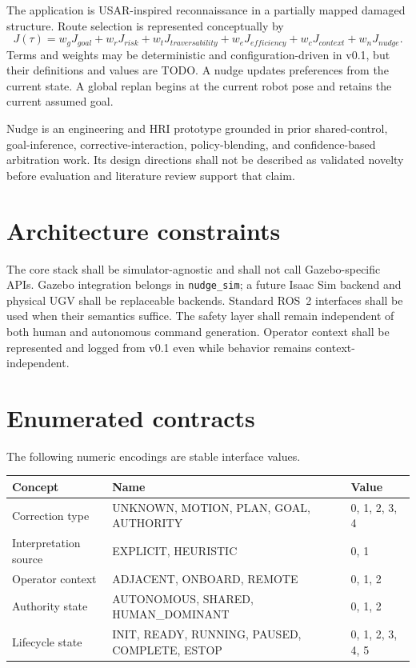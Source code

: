 \documentclass[11pt]{article}
\begin{document}
The application is USAR-inspired reconnaissance in a partially mapped damaged
structure. Route selection is represented conceptually by
\[
J(\tau)=w_gJ_{goal}+w_rJ_{risk}+w_tJ_{traversability}+w_eJ_{efficiency}
       +w_cJ_{context}+w_nJ_{nudge}.
\]
Terms and weights may be deterministic and configuration-driven in v0.1, but
their definitions and values are TODO. A nudge updates preferences from the
current state. A global replan begins at the current robot pose and retains the
current assumed goal.

Nudge is an engineering and HRI prototype grounded in prior shared-control,
goal-inference, corrective-interaction, policy-blending, and confidence-based
arbitration work. Its design directions shall not be described as validated
novelty before evaluation and literature review support that claim.

\section{Architecture constraints}
The core stack shall be simulator-agnostic and shall not call Gazebo-specific
APIs. Gazebo integration belongs in \texttt{nudge\_sim}; a future Isaac Sim
backend and physical UGV shall be replaceable backends. Standard ROS~2
interfaces shall be used when their semantics suffice. The safety layer shall
remain independent of both human and autonomous command generation. Operator
context shall be represented and logged from v0.1 even while behavior remains
context-independent.

\section{Enumerated contracts}
The following numeric encodings are stable interface values.

\begin{longtable}{lll}
\toprule
Concept & Name & Value \\
\midrule
\endhead
Correction type & UNKNOWN, MOTION, PLAN, GOAL, AUTHORITY & 0, 1, 2, 3, 4 \\
Interpretation source & EXPLICIT, HEURISTIC & 0, 1 \\
Operator context & ADJACENT, ONBOARD, REMOTE & 0, 1, 2 \\
Authority state & AUTONOMOUS, SHARED, HUMAN\_DOMINANT & 0, 1, 2 \\
Lifecycle state & INIT, READY, RUNNING, PAUSED, COMPLETE, ESTOP & 0, 1, 2, 3, 4, 5 \\
\bottomrule
\end{longtable}
\end{document}
